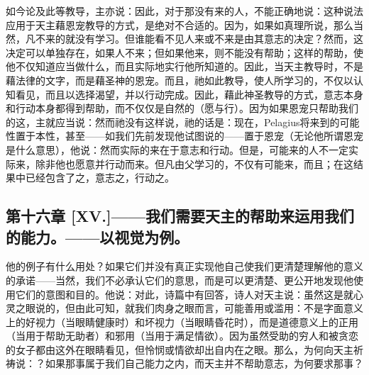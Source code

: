 如今论及此等教导，主亦说：因此，对于那没有来的人，不能正确地说：这种说法应用于天主藉恩宠教导的方式，是绝对不合适的。因为，如果如真理所说，那么当然，凡不来的就没有学习。但谁能看不见人来或不来是由其意志的决定？然而，这决定可以单独存在，如果人不来；但如果他来，则不能没有帮助；这样的帮助，使他不仅知道应当做什么，而且实际地实行他所知道的。因此，当天主教导时，不是藉法律的文字，而是藉圣神的恩宠。而且，祂如此教导，使人所学习的，不仅以认知看见，而且以选择渴望，并以行动完成。因此，藉此神圣教导的方式，意志本身和行动本身都得到帮助，而不仅仅是自然的（愿与行）。因为如果恩宠只帮助我们的这，主就应当说：然而祂没有这样说，祂的话是：现在，Pelagius将来到的可能性置于本性，甚至——如我们先前发现他试图说的——置于恩宠（无论他所谓恩宠是什么意思），他说：然而实际的来在于意志和行动。但是，可能来的人不一定实际来，除非他也愿意并行动而来。但凡由父学习的，不仅有可能来，而且；在这结果中已经包含了之，意志之，行动之。\par


\subsection{第十六章 [XV.]——我们需要天主的帮助来运用我们的能力。——以视觉为例。}

他的例子有什么用处？如果它们并没有真正实现他自己使我们更清楚理解他的意义的承诺——当然，我们不必承认它们的意思，而是可以更清楚、更公开地发现他使用它们的意图和目的。他说：对此，诗篇中有回答，诗人对天主说：虽然这是就心灵之眼说的，但由此可知，就我们肉身之眼而言，可能善用或滥用：不是字面意义上的好视力（当眼睛健康时）和坏视力（当眼睛昏花时），而是道德意义上的正用（当用于帮助无助者）和邪用（当用于满足情欲）。因为虽然受助的穷人和被贪恋的女子都由这外在眼睛看见，但怜悯或情欲却出自内在之眼。那么，为何向天主祈祷说：？如果那事属于我们自己能力之内，而天主并不帮助意志，为何要求那事？\par


